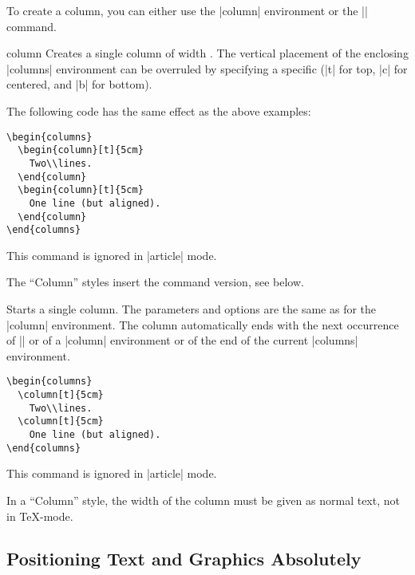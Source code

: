 To create a column, you can either use the |column| environment or the
|\column| command. 

\begin{environment}{{column}}
  Creates a single column of width . The vertical
  placement of the enclosing |columns| environment can be overruled by
  specifying a specific  (|t| for top, |c| for
  centered, and |b| for bottom). 

  \example The following code has the same effect as the above examples:
\begin{verbatim}
\begin{columns}
  \begin{column}[t]{5cm}
    Two\\lines.
  \end{column}
  \begin{column}[t]{5cm}
    One line (but aligned).
  \end{column}
\end{columns}
\end{verbatim}
  \articlenote
  This command is ignored in |article| mode.

  \lyxnote
  The ``Column'' styles insert the command version, see below.
\end{environment}

\begin{command}{{\column}}
  Starts a single column. The parameters and options are the same as
  for the |column| environment. The column automatically ends with the
  next occurrence of |\column| or of a |column| environment or of the
  end of the current |columns| environment.

  \example 
\begin{verbatim}
\begin{columns}
  \column[t]{5cm}
    Two\\lines.
  \column[t]{5cm}
    One line (but aligned).
\end{columns}
\end{verbatim}
  \articlenote
  This command is ignored in |article| mode.

  \lyxnote
  In a ``Column'' style, the width of the column must be given as
  normal text, not in \TeX-mode.
\end{command}



\subsection{Positioning Text and Graphics Absolutely}

